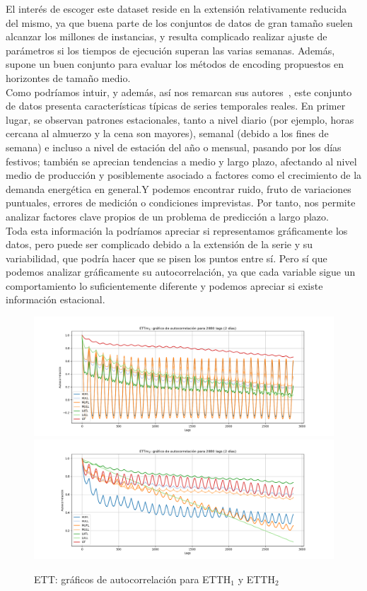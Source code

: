 El interés de escoger este dataset reside en la extensión relativamente reducida del mismo, ya que buena parte de los conjuntos de datos de gran tamaño suelen alcanzar los millones de instancias, y resulta complicado realizar ajuste de parámetros si los tiempos de ejecución superan las varias semanas. Además, supone un buen conjunto para evaluar los métodos de encoding propuestos en horizontes de tamaño medio.\\

Como podríamos intuir, y además, así nos remarcan sus autores~\cite{zhou2021etdataset}, este conjunto de datos presenta características típicas de series temporales reales. En primer lugar, se observan patrones estacionales, tanto a nivel diario (por ejemplo, horas cercana al almuerzo y la cena son mayores), semanal (debido a los fines de semana) e incluso a nivel de estación del año o mensual, pasando por los días festivos; también se aprecian tendencias a medio y largo plazo, afectando al nivel medio de producción y posiblemente asociado a factores como el crecimiento de la demanda energética en general.Y podemos encontrar ruido, fruto de variaciones puntuales, errores de medición o condiciones imprevistas. Por tanto, nos permite analizar factores clave propios de un problema de predicción a largo plazo.\\

Toda esta información la podríamos apreciar si representamos gráficamente los datos, pero puede ser complicado debido a la extensión de la serie y su variabilidad, que podría hacer que se pisen los puntos entre sí. Pero sí que podemos analizar gráficamente su autocorrelación, ya que cada variable sigue un comportamiento lo suficientemente diferente y podemos apreciar si existe información estacional. 

\begin{figure}[!ht]
	\centering
	\includegraphics[scale=0.37]{img/etth1_autocorrelacion.png}
	\includegraphics[scale=0.37]{img/etth2_autocorrelacion.png}
	\caption{ETT: gráficos de autocorrelación para ETTH$_1$ y ETTH$_2$}
	\label{autoett}
\end{figure}

